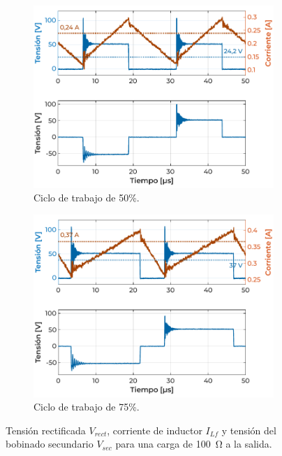 \begin{figure}[h]
    \centering
    \begin{subfigure}{0.48\textwidth}
        \centering
        \includegraphics[width=\textwidth]{Imagenes/Con Carga - Caso 1.pdf}
        \caption{Ciclo de trabajo de 50\%.}
        \label{fig:ensayo_concarga15V_1}
    \end{subfigure}
    \hspace{0.5em}
    \begin{subfigure}{0.48\textwidth}
        \centering
        \includegraphics[width=\textwidth]{Imagenes/Con Carga - Caso 5.pdf}
        \caption{Ciclo de trabajo de 75\%.}
        \label{fig:ensayo_concarga15V_2}
    \end{subfigure}
    \caption{Tensión rectificada $V_{rect}$, corriente de inductor $I_{Lf}$ y tensión del bobinado secundario $V_{sec}$ para una carga de \SI[]{100}{\ohm} a la salida.}
    \label{fig:ensayo_concarga15V}
\end{figure}

